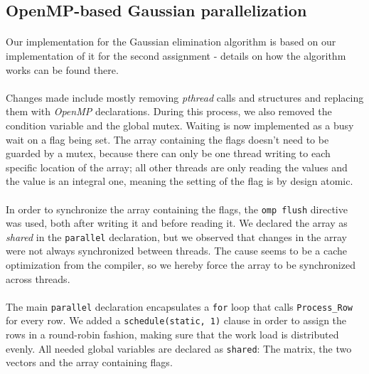 \documentclass[]{article}
\begin{document}
\subsection{OpenMP-based Gaussian parallelization}

\paragraph{} Our implementation for the Gaussian elimination algorithm is based on our implementation of it for the second assignment - details on how the algorithm works can be found there.

\paragraph{} Changes made include mostly removing \textit{pthread} calls and structures and replacing them with \textit{OpenMP} declarations. During this process, we also removed the condition variable and the global mutex. Waiting is now implemented as a busy wait on a flag being set. The array containing the flags doesn't need to be guarded by a mutex, because there can only be one thread writing to each specific location of the array; all other threads are only reading the values and the value is an integral one, meaning the setting of the flag is by design atomic.

\paragraph{} In order to synchronize the array containing the flags, the \texttt{omp flush} directive was used, both after writing it and before reading it. We declared the array as \textit{shared} in the \texttt{parallel} declaration, but we observed that changes in the array were not always synchronized between threads. The cause seems to be a cache optimization from the compiler, so we hereby force the array to be synchronized across threads.

\paragraph{} The main \texttt{parallel} declaration encapsulates a \texttt{for} loop that calls \texttt{Process\_Row} for every row. We added a \texttt{schedule(static, 1)} clause in order to assign the rows in a round-robin fashion, making sure that the work load is distributed evenly. All needed global variables are declared as \texttt{shared}: The matrix, the two vectors and the array containing flags.
\end{document}
